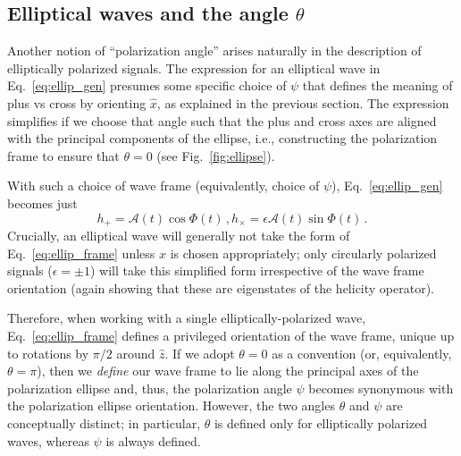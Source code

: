 \documentclass[aps,prd,twocolumn,superscriptaddress,preprintnumbers,floatfix,nofootinbib]{revtex4-2}
\newcommand{\beq}{\begin{equation}}
\newcommand{\eeq}{\end{equation}}
\newcommand*{\eq}[1]{Eq.~\eqref{eq:#1}}
\begin{document}
\subsection{Elliptical waves and the angle $\theta$}
\label{sec:ellip}

Another notion of ``polarization angle'' arises naturally in the description of elliptically polarized signals.
The expression for an elliptical wave in \eq{ellip_gen} presumes some specific choice of $\psi$ that defines the meaning of plus vs cross by orienting $\hat{x}$, as explained in the previous section.
The expression simplifies if we choose that angle such that the plus and cross axes are aligned with the principal components of the ellipse, i.e., constructing the polarization frame to ensure that $\theta = 0$ (see Fig.~\ref{fig:ellipse}).

With such a choice of wave frame (equivalently, choice of $\psi$), \eq{ellip_gen} becomes just
\begin{subequations} \label{eq:ellip_frame}
\beq
h_+ = \mathcal{A}(t) \cos \Phi(t) \, ,
\eeq
\beq
h_\times = \epsilon \mathcal{A}(t) \sin \Phi(t)\, .
\eeq
\end{subequations}
Crucially, an elliptical wave will generally not take the form of Eq.~\eqref{eq:ellip_frame} unless $\hat{x}$ is chosen appropriately; only circularly polarized signals ($\epsilon=\pm1$) will take  this simplified form irrespective of the wave frame orientation (again showing that these are eigenstates of the helicity operator).

Therefore, when working with a single elliptically-polarized wave, Eq.~\eqref{eq:ellip_frame} defines a privileged orientation of the wave frame, unique up to rotations by $\pi/2$ around $\hat{z}$.
If we adopt $\theta =0$ as a convention (or, equivalently, $\theta=\pi$), then we \emph{define} our wave frame to lie along the principal axes of the polarization ellipse and, thus, the polarization angle $\psi$ becomes synonymous with the polarization ellipse orientation.
However, the two angles $\theta$ and $\psi$ are conceptually distinct; in particular, $\theta$ is defined only for elliptically polarized waves, whereas $\psi$ is always defined.

\end{document}
